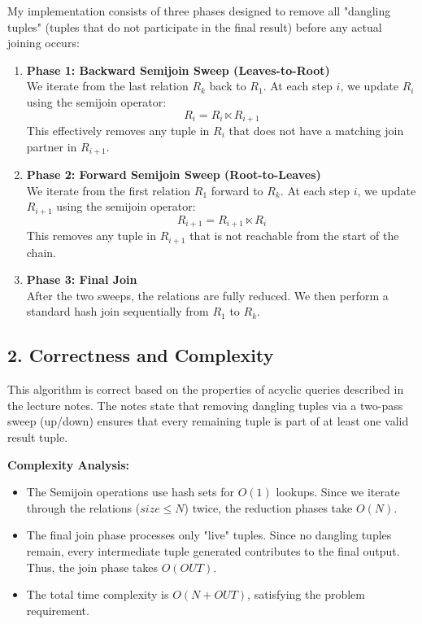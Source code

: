 \documentclass[11pt]{article}
\begin{document}
My implementation consists of three phases designed to remove all "dangling tuples" (tuples that do not participate in the final result) before any actual joining occurs:

\begin{enumerate}
    \item \textbf{Phase 1: Backward Semijoin Sweep (Leaves-to-Root)} \\
    We iterate from the last relation $R_k$ back to $R_1$. At each step $i$, we update $R_i$ using the semijoin operator:
    \[ R_i = R_i \ltimes R_{i+1} \]
    This effectively removes any tuple in $R_i$ that does not have a matching join partner in $R_{i+1}$.

    \item \textbf{Phase 2: Forward Semijoin Sweep (Root-to-Leaves)} \\
    We iterate from the first relation $R_1$ forward to $R_k$. At each step $i$, we update $R_{i+1}$ using the semijoin operator:
    \[ R_{i+1} = R_{i+1} \ltimes R_i \]
    This removes any tuple in $R_{i+1}$ that is not reachable from the start of the chain.

    \item \textbf{Phase 3: Final Join} \\
    After the two sweeps, the relations are fully reduced. We then perform a standard hash join sequentially from $R_1$ to $R_k$.
\end{enumerate}

\subsection*{2. Correctness and Complexity}
This algorithm is correct based on the properties of acyclic queries described in the lecture notes. The notes state that removing dangling tuples via a two-pass sweep (up/down) ensures that every remaining tuple is part of at least one valid result tuple.

\textbf{Complexity Analysis:}
\begin{itemize}
    \item The Semijoin operations use hash sets for $O(1)$ lookups. Since we iterate through the relations ($size \le N$) twice, the reduction phases take $O(N)$.
    \item The final join phase processes only "live" tuples. Since no dangling tuples remain, every intermediate tuple generated contributes to the final output. Thus, the join phase takes $O(OUT)$.
    \item The total time complexity is $O(N + OUT)$, satisfying the problem requirement.
\end{itemize}
\end{document}
